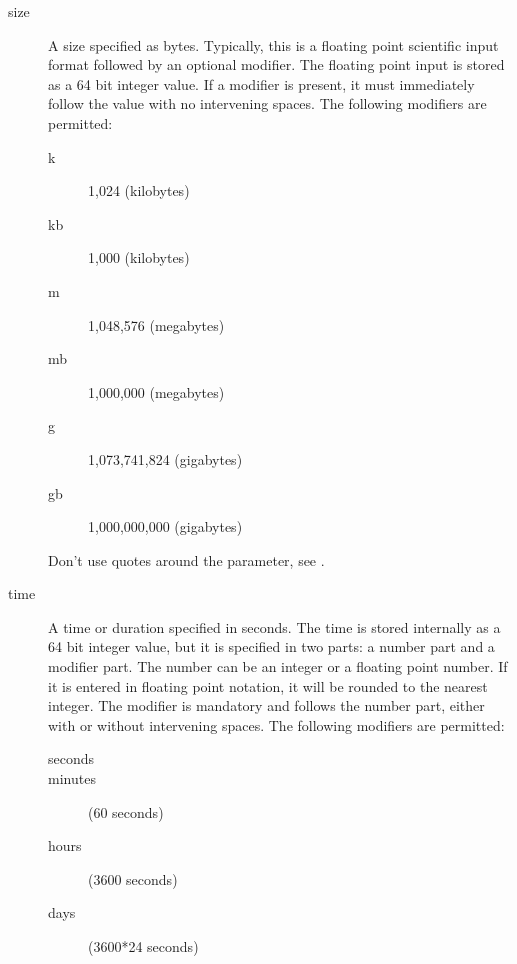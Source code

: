 \begin{description}
\item [size]
    \label{DataTypeSize}
    \label{Size1}
A size specified as bytes. Typically, this is  a floating point scientific
input format followed by an optional modifier. The  floating point input is
stored as a 64 bit integer value.  If a modifier is present, it must
immediately follow the  value with no intervening spaces. The following
modifiers are permitted:

\begin{description}
\item [k]
   1,024 (kilobytes)

\item [kb]
   1,000 (kilobytes)

\item [m]
   1,048,576 (megabytes)

\item [mb]
   1,000,000 (megabytes)

\item [g]
   1,073,741,824 (gigabytes)

\item [gb]
   1,000,000,000 (gigabytes)
\end{description}

    Don't use quotes around the parameter, see .


\item [time]
    \label{DataTypeTime}
    \label{Time}
A time or duration specified in seconds.  The time is stored internally as
a 64 bit integer value, but it is specified in two parts: a number part and
a modifier part.  The number can be an integer or a floating point number.
If it is entered in floating point notation, it will be rounded to the
nearest integer.  The modifier is mandatory and follows the number part,
either with or without intervening spaces.  The following modifiers are
permitted:

\begin{description}

\item [seconds]

\item [minutes]
    (60 seconds)

\item [hours]
    (3600 seconds)

\item [days]
    (3600*24 seconds)


\end{description}
\end{description}
